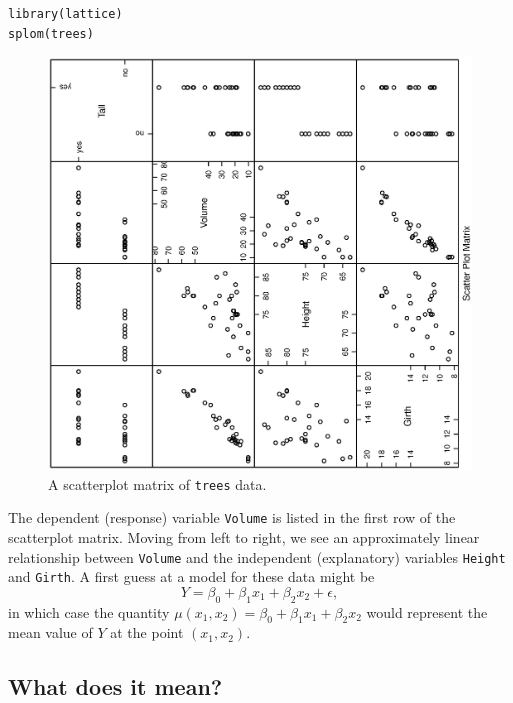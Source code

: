 \documentclass[captions=tableheading]{scrbook}
\begin{document}
\begin{example}
\begin{verbatim}
library(lattice)
splom(trees)
\end{verbatim}



\begin{figure}[th]
    \includegraphics[angle=270, totalheight=4in]{img/splom-trees.ps}
    \caption[Scatterplot matrix of \texttt{trees} data]{\small A scatterplot matrix of \texttt{trees} data.}
    \label{fig:splom-trees}
  \end{figure}

The dependent (response) variable \texttt{Volume} is listed in the first row of the scatterplot matrix. Moving from left to right, we see an approximately linear relationship between \texttt{Volume} and the independent (explanatory) variables \texttt{Height} and \texttt{Girth}. A first guess at a model for these data might be
\begin{equation}
Y=\beta_{0}+\beta_{1}x_{1}+\beta_{2}x_{2}+\epsilon,
\end{equation}
in which case the quantity \(\mu(x_{1},x_{2})=\beta_{0}+\beta_{1}x_{1}+\beta_{2}x_{2}\) would represent the mean value of \(Y\) at the point \((x_{1},x_{2})\).
\end{example}
\subsection{What does it mean?}
\label{sec-12-1-1}
\end{document}

